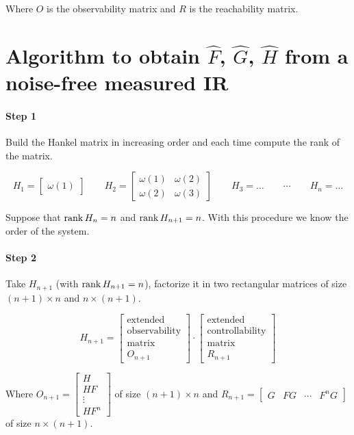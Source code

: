 Where $O$ is the observability matrix and $R$ is the reachability matrix.

\section{Algorithm to obtain $\hat{F}$, $\hat{G}$, $\hat{H}$ from a noise-free measured IR}

\paragraph{Step 1} Build the Hankel matrix in increasing order and each time compute the rank of the matrix.

\[
    H_1 = \begin{bmatrix}
        \omega(1)
    \end{bmatrix}
    \qquad
    H_2 = \begin{bmatrix}
        \omega(1) & \omega(2) \\
        \omega(2) & \omega(3)
    \end{bmatrix}
    \qquad
    H_3 = \ldots
    \qquad
    \cdots
    \qquad
    H_n = \ldots
\]

Suppose that $\operatorname{rank} H_n = n$ and $\operatorname{rank} H_{n+1} = n$.
With this procedure we know the order of the system.

\paragraph{Step 2} Take $H_{n+1}$ (with $\operatorname{rank} H_{n+1} = n$), factorize it in two rectangular matrices of size $(n+1) \times n$ and $n \times (n+1)$.

\[
    H_{n+1} = \begin{bmatrix}
        \text{extended} \\
        \text{observability} \\
        \text{matrix} \\
        O_{n+1}
    \end{bmatrix} \cdot \begin{bmatrix}
        \text{extended} \\
        \text{controllability} \\
        \text{matrix} \\
        R_{n+1}
    \end{bmatrix}
\]

Where $O_{n+1} = \begin{bmatrix}
    H \\ HF \\ \vdots \\ HF^n
\end{bmatrix}$ of size $(n+1)\times n$ and $R_{n+1} = \begin{bmatrix}
    G & FG & \cdots & F^nG
\end{bmatrix}$ of size $n\times (n+1)$.


